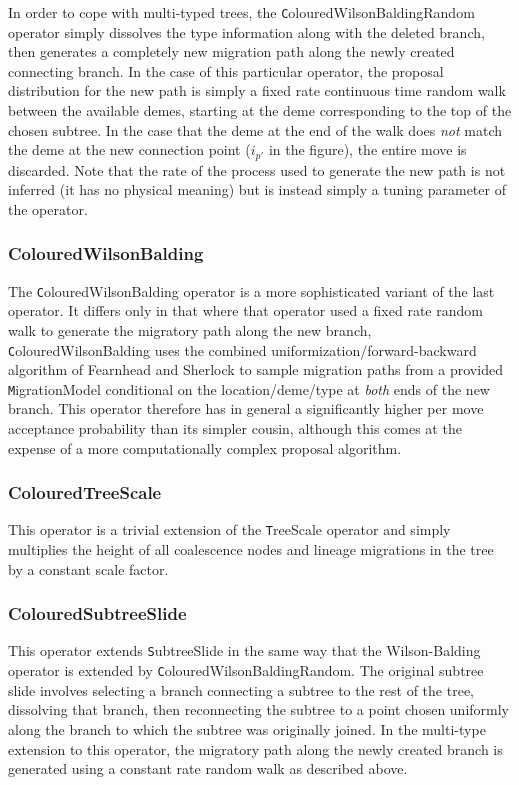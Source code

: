 \documentclass[a4paper,11pt]{article}
\newcommand{\class}[1]{{\texttt #1}}
\begin{document}
 In order to cope with multi-typed trees, the
\class{ColouredWilsonBaldingRandom} operator simply dissolves the type
information along with the deleted branch, then generates a completely
new migration path along the newly created connecting branch.  In the
case of this particular operator, the proposal distribution for the
new path is simply a fixed rate continuous time random walk between
the available demes, starting at the deme corresponding to the top of
the chosen subtree.  In the case that the deme at the end of the walk
does \emph{not} match the deme at the new connection point ($i_{p'}$
in the figure), the entire move is discarded.  Note that the rate of
the process used to generate the new path is not inferred (it has no
physical meaning) but is instead simply a tuning parameter of the operator.

\subsubsection{ColouredWilsonBalding}

The \class{ColouredWilsonBalding} operator is a more sophisticated
variant of the last operator.  It differs only in that where that
operator used a fixed rate random walk to generate the migratory path
along the new branch, \class{ColouredWilsonBalding} uses the combined
uniformization/forward-backward algorithm of Fearnhead and Sherlock
\cite{Fearnhead2006} to sample migration paths from a provided
\class{MigrationModel} conditional on the location/deme/type at
\emph{both} ends of the new branch.  This operator therefore has in
general a significantly higher per move acceptance probability than
its simpler cousin, although this comes at the expense of a more
computationally complex proposal algorithm.

\subsubsection{ColouredTreeScale}

This operator is a trivial extension of the \class{TreeScale} operator
and simply multiplies the height of all coalescence nodes and lineage
migrations in the tree by a constant scale factor.

\subsubsection{ColouredSubtreeSlide}

This operator extends \class{SubtreeSlide} in the same way that the
Wilson-Balding operator is extended by
\class{ColouredWilsonBaldingRandom}.  The original subtree slide
involves selecting a branch connecting a subtree to the rest of the
tree, dissolving that branch, then reconnecting the subtree to a point chosen
uniformly along the branch to which the subtree was originally joined.  In the
multi-type extension to this operator, the migratory path along the
newly created branch is generated using a constant rate random walk as
described above.
\end{document}
